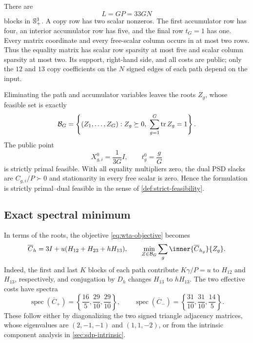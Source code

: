 There are
\begin{equation}
 L=GP=33GN
 \label{eq:wta-block-count}
\end{equation}
blocks in $\mathbb{S}_{+}^3$.  A copy row has two scalar nonzeros.  The first
accumulator row has four, an interior accumulator row has five, and the
final row $t_G=1$ has one.
Every matrix coordinate and every free-scalar column occurs in at most two
rows.  Thus the equality matrix has scalar row sparsity at most five and
scalar column sparsity at most two.  Its support, right-hand side, and all
costs are public; only the $12$ and $13$ copy coefficients on the $N$ signed
edges of each path depend on the input.

Eliminating the path and accumulator variables leaves the roots $Z_g$,
whose feasible set is exactly
\begin{equation}
 \mathcal B_G=\left\{(Z_1,\ldots,Z_G):Z_g\succeq0,
                       \ \sum_{g=1}^G\operatorname{tr} Z_g=1\right\}.
 \label{eq:wta-root-feasible-set}
\end{equation}
The public point
\begin{equation}
 X_{g,i}^0=\frac1{3G}I,\qquad t_g^0=\frac gG
 \label{eq:wta-public-point}
\end{equation}
is strictly primal feasible.  With all equality multipliers zero, the dual
PSD slacks are $C_{g,i}/P\succ0$ and stationarity in every free scalar is
zero.  Hence the formulation is strictly primal--dual feasible in the sense
of \cref{def:strict-feasibility}.

\subsection{Exact spectral minimum}
\label{sec:wta-optimum}

In terms of the roots, the objective \eqref{eq:wta-objective} becomes
\begin{equation}
 \overline C_h=3I+u(H_{12}+H_{23}+hH_{13}),
 \qquad
 \min_{Z\in\mathcal B_G}\sum_g\inner{\overline C_{h_g}}{Z_g}.
 \label{eq:wta-effective-cost}
\end{equation}
Indeed, the first and last $K$ blocks of each path contribute
$K\gamma/P=u$ to $H_{12}$ and $H_{13}$, respectively, and
conjugation by $D_h$ changes $H_{13}$ to $hH_{13}$.  The two effective costs
have spectra
\begin{equation}
 \operatorname{spec}(\overline C_+)
   =\left\{\frac{16}5,\frac{29}{10},\frac{29}{10}\right\},
 \qquad
 \operatorname{spec}(\overline C_-)
   =\left\{\frac{31}{10},\frac{31}{10},\frac{14}5\right\}.
 \label{eq:wta-cost-spectra}
\end{equation}
These follow either by diagonalizing the two signed triangle adjacency
matrices, whose eigenvalues are $(2,-1,-1)$ and $(1,1,-2)$, or from the
intrinsic component analysis in \cref{sec:sdp-intrinsic}.

